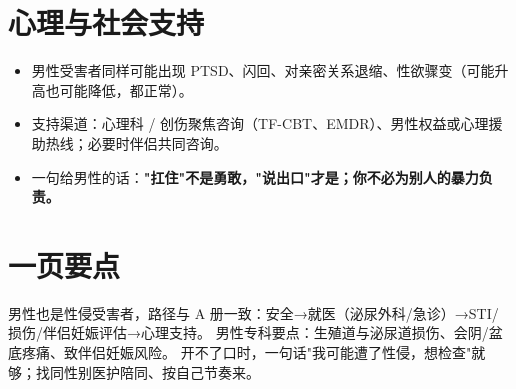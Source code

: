 \section{心理与社会支持}
\begin{itemize}
  \item 男性受害者同样可能出现 PTSD、闪回、对亲密关系退缩、性欲骤变（可能升高也可能降低，都正常）。
  \item 支持渠道：心理科 / 创伤聚焦咨询（TF-CBT、EMDR）、男性权益或心理援助热线；必要时伴侣共同咨询。
  \item 一句给男性的话：\textbf{"扛住"不是勇敢，"说出口"才是；你不必为别人的暴力负责。}
\end{itemize}

\section{一页要点}
男性也是性侵受害者，路径与 A 册一致：安全→就医（泌尿外科/急诊）→STI/损伤/伴侣妊娠评估→心理支持。
男性专科要点：生殖道与泌尿道损伤、会阴/盆底疼痛、致伴侣妊娠风险。
开不了口时，一句话"我可能遭了性侵，想检查"就够；找同性别医护陪同、按自己节奏来。


